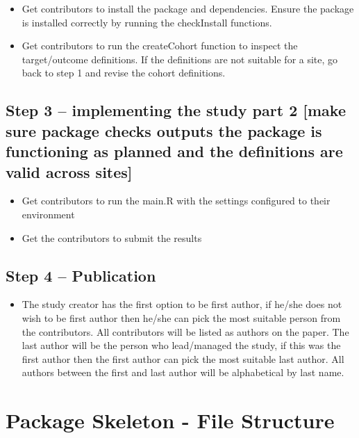 \documentclass[]{article}
\providecommand{\tightlist}{%
  \setlength{\itemsep}{0pt}\setlength{\parskip}{0pt}}
\begin{document}
\begin{itemize}
\tightlist
\item
  Get contributors to install the package and dependencies. Ensure the
  package is installed correctly by running the checkInstall functions.
\item
  Get contributors to run the createCohort function to inspect the
  target/outcome definitions. If the definitions are not suitable for a
  site, go back to step 1 and revise the cohort definitions.
\end{itemize}

\subsection{Step 3 -- implementing the study part 2 {[}make sure package
checks outputs the package is functioning as planned and the definitions
are valid across
sites{]}}\label{step-3-implementing-the-study-part-2-make-sure-package-checks-outputs-the-package-is-functioning-as-planned-and-the-definitions-are-valid-across-sites}

\begin{itemize}
\tightlist
\item
  Get contributors to run the main.R with the settings configured to
  their environment
\item
  Get the contributors to submit the results
\end{itemize}

\subsection{Step 4 -- Publication}\label{step-4-publication}

\begin{itemize}
\tightlist
\item
  The study creator has the first option to be first author, if he/she
  does not wish to be first author then he/she can pick the most
  suitable person from the contributors. All contributors will be listed
  as authors on the paper. The last author will be the person who
  lead/managed the study, if this was the first author then the first
  author can pick the most suitable last author. All authors between the
  first and last author will be alphabetical by last name.
\end{itemize}

\section{Package Skeleton - File
Structure}\label{package-skeleton---file-structure}
\end{document}
